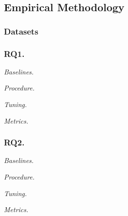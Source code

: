 \subsection{Empirical Methodology}

\subsubsection{Datasets}

\subsubsection{RQ1.}

{\em Baselines.}

{\em Procedure.}

{\em Tuning.}

{\em Metrics.}

\subsubsection{RQ2.}

{\em Baselines.}

{\em Procedure.}

{\em Tuning.}

{\em Metrics.}
